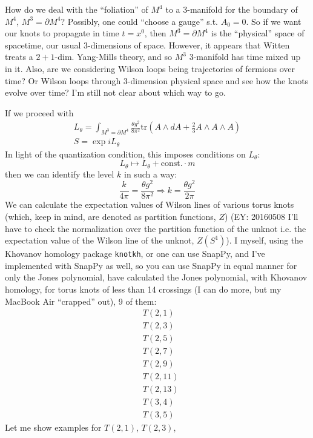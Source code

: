\documentclass[10pt]{amsart}
\begin{document}
\begin{multicols}{2}
How do we deal with the ``foliation'' of $M^4$ to a 3-manifold for the boundary of $M^4$, $M^3 = \partial M^4$?  Possibly, one could ``choose a gauge'' s.t. $A_0 =0$.  So if we want our knots to propagate in time $t=x^0$, then $M^3 = \partial M^4$ is the ``physical'' space of spacetime, our usual 3-dimensions of space.  However, it appears that Witten \cite{Witten:1988hf} treats a $2+1$-dim. Yang-Mills theory, and so $M^3$ 3-manifold has time mixed up in it.  Also, are we considering Wilson loops being trajectories of fermions over time?  Or Wilson loops through 3-dimension physical space and see how the knots evolve over time?  I'm still not clear about which way to go.

If we proceed with
\begin{equation}
\begin{gathered}
  L_{\theta} = \int_{M^3 = \partial M^4} \frac{ \theta g^2}{8 \pi^2} \text{tr}(A\wedge dA + \frac{2}{3} A\wedge A \wedge A ) \\ 
  S = \exp{ i L_{\theta}}
  \end{gathered}
\end{equation}
In light of the quantization condition, this imposes conditions on $L_{\theta}$:
\[
L_{\theta} \mapsto L_{\theta} + \text{const.} \cdot m
\]
then we can identify the level $k$ in such a way:
\[
\frac{k}{4\pi} = \frac{\theta g^2}{ 8\pi^2} \Longrightarrow k = \frac{\theta g^2}{2\pi}
\]
We can calculate the expectation values of Wilson lines of various torus knots (which, keep in mind, are denoted as partition functions, $Z$) (EY: 20160508 I'll have to check the normalization over the partition function of the unknot i.e. the expectation value of the Wilson line of the unknot, $Z(S^1)$).  I myself, using the Khovanov homology package  \verb|knotkh|, or one can use SnapPy, and I've implemented with SnapPy as well, so you can use SnapPy in equal manner for only the Jones polynomial, have calculated the Jones polynomial, with Khovanov homology, for torus knots of less than 14 crossings (I can do more, but my MacBook Air ``crapped'' out), 9 of them:
\[
\begin{aligned}
  & T(2,1) \\ 
  & T(2,3) \\ 
  & T(2,5) \\ 
  & T(2,7) \\ 
  & T(2,9) \\ 
  & T(2,11) \\ 
  & T(2,13) \\ 
  & T(3,4) \\ 
  & T(3,5) 
  \end{aligned}
\]
Let me show examples for $T(2,1)$, $T(2,3)$, %


\end{multicols}
\end{document}
